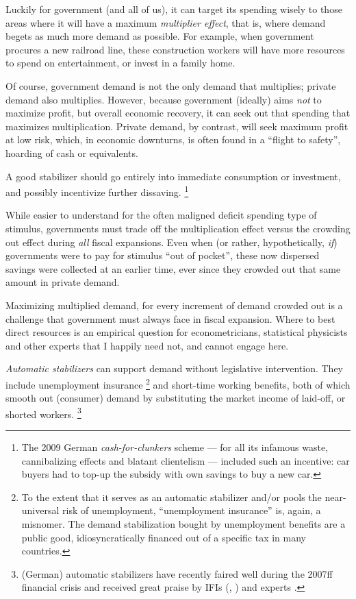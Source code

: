 Luckily for government (and all of us), it can target its spending wisely to those areas where it will have a maximum \emph{multiplier effect}, that is, where demand begets as much more demand as possible.
For example, when government procures a new railroad line, these construction workers will have more resources to spend on entertainment, or invest in a family home.

Of course, government demand is not the only demand that multiplies;
private demand also multiplies.
However, because government (ideally) aims \emph{not} to maximize profit, but overall economic recovery, it can seek out that spending that maximizes multiplication.
Private demand, by contrast, will seek maximum profit at low risk, which, in economic downturns, is often found in a ``flight to safety'', hoarding of cash or equivalents.

A good stabilizer should go entirely into immediate consumption or investment, and possibly incentivize further dissaving.
\footnote{
	The 2009 German \emph{cash-for-clunkers} scheme --- for all its infamous waste, cannibalizing effects and blatant clientelism --- included such an incentive:
	car buyers had to top-up the subsidy with own savings to buy a new car.
}

While easier to understand for the often maligned deficit spending type of stimulus, governments must trade off the multiplication effect versus the crowding out effect during \emph{all} fiscal expansions.
Even when (or rather, hypothetically, \emph{if}) governments were to pay for stimulus ``out of pocket'', these now dispersed savings were collected at an earlier time, ever since they crowded out that same amount in private demand.

Maximizing multiplied demand, for every increment of demand crowded out is a challenge that government must always face in fiscal expansion.
Where to best direct resources is an empirical question for econometricians, statistical physicists and other experts that I happily need not, and cannot engage here.


\emph{Automatic stabilizers} can support demand without legislative intervention.
They include unemployment insurance
\footnote{
	To the extent that it serves as an automatic stabilizer and/or pools the near-universal risk of unemployment, ``unemployment insurance'' is, again, a misnomer.
	The demand stabilization bought by unemployment benefits are a public good, idiosyncratically financed out of a specific tax in many countries.
}
and short-time working benefits, both of which smooth out (consumer) demand by substituting the market income of laid-off, or shorted workers.
\footnote{
	(German) automatic stabilizers have recently faired well during the 2007ff financial crisis and received great praise by \glspl{IFI} (\citealt[20]{IMF-2008-ab}, \citealt[19]{WorldBank2008}) and experts \citep[8]{BofingerFranz-2007-aa}.
}

